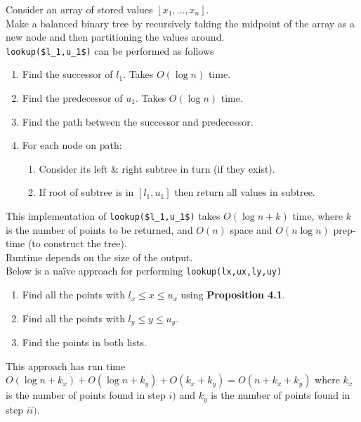\documentclass[11pt,a4paper]{article}
\begin{document}
Consider an array of stored values $[x_1,\dots,x_n]$.\\
Make a balanced binary tree by recursively taking the midpoint of the array as a new node and then partitioning the values around.\\
\lstinline!lookup($l_1,u_1$)! can be performed as follows
\begin{enumerate}
	\item Find the successor of $l_1$. Takes $O(\log n)$ time.
	\item Find the predecessor of $u_1$. Takes $O(\log n)$ time.
	\item Find the path between the successor and predecessor.
	\item For each node on path:
	\begin{enumerate}
		\item Consider its left \& right subtree in turn (if they exist).
		\item If root of subtree is in $[l_1,u_1]$ then return all values in subtree.
	\end{enumerate}
\end{enumerate}
This implementation of \lstinline!lookup($l_1,u_1$)! takes $O(\log n+k)$ time, where $k$ is the number of points to be returned, and $O(n)$ space and $O(n\log n)$ prep-time (to construct the tree).\\
\nb Runtime depends on the size of the output.\\

Below is a na\"ive approach for performing \lstinline!lookup(lx,ux,ly,uy)!
\begin{enumerate}
	\item Find all the points with $l_x\leq x\leq u_x$ using \textbf{Proposition 4.1}.
	\item Find all the points with $l_y\leq y\leq u_y$.
	\item Find the points in both lists.
\end{enumerate}
This approach has run time $O(\log n+k_x)+O(\log n+k_y)+O(k_x+k_y)=O(n+k_x+k_y)$ where $k_x$ is the number of points found in step $i)$ and $k_y$ is the number of points found in step $ii)$.\\
\end{document}
